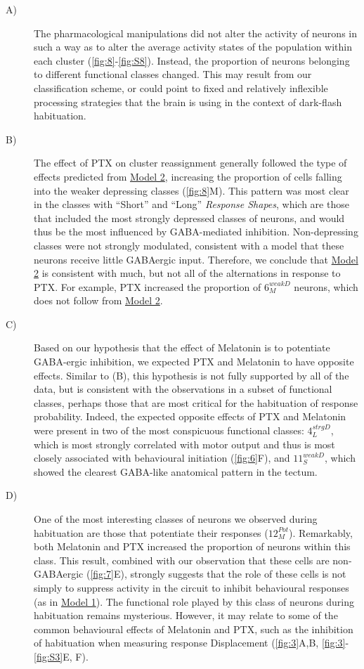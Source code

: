 \documentclass[9pt,lineno]{RandlettLab_elife}
\begin{document}
\begin{description}
\item[A)]
The pharmacological manipulations did not alter the activity of neurons in such a way as to alter the average activity states of the population within each cluster (\autoref{fig:8}-\autoref{fig:S8}). Instead, the proportion of neurons belonging to different functional classes changed. This may result from our classification scheme, or could point to fixed and relatively inflexible processing strategies that the brain is using in the context of dark-flash habituation.
\item[B)]
The effect of PTX on cluster reassignment generally followed the type of effects predicted from \underline{Model 2}, increasing the proportion of cells falling into the weaker depressing classes (\autoref{fig:8}M). This pattern was most clear in the classes with “Short” and “Long” \emph{Response Shapes}, which are those that included the most strongly depressed classes of neurons, and would thus be the most influenced by GABA-mediated inhibition. Non-depressing classes were not strongly modulated, consistent with a model that these neurons receive little GABAergic input. Therefore, we conclude that \underline{Model 2} is consistent with much, but not all of the alternations in response to PTX. For example, PTX increased the proportion of $6_{M}^{weakD}$ neurons, which does not follow from \underline{Model 2}.
\item[C)] 
Based on our hypothesis that the effect of Melatonin is to potentiate GABA-ergic inhibition, we expected PTX and Melatonin to have opposite effects. Similar to (B), this hypothesis is not fully supported by all of the data, but is consistent with the observations in a subset of functional classes, perhaps those that are most critical for the habituation of response probability. Indeed, the expected opposite effects of PTX and Melatonin were present in two of the most conspicuous functional classes: $4_{L}^{strgD}$, which is most strongly correlated with motor output and thus is most closely associated with behavioural initiation (\autoref{fig:6}F), and $11_{S}^{weakD}$, which showed the clearest GABA-like anatomical pattern in the tectum. 
\item[D)]
One of the most interesting classes of neurons we observed during habituation are those that potentiate their responses ($12_{M}^{Pot}$). Remarkably, both Melatonin and PTX increased the proportion of neurons within this class. This result, combined with our observation that these cells are non-GABAergic (\autoref{fig:7}E), strongly suggests that the role of these cells is not simply to suppress activity in the circuit to inhibit behavioural responses (as in \underline{Model 1}). The functional role played by this class of neurons during habituation remains mysterious. However, it may relate to some of the common behavioural effects of Melatonin and PTX, such as the inhibition of habituation when measuring response Displacement (\autoref{fig:3}A,B, \autoref{fig:3}-\autoref{fig:S3}E, F). 

\end{description}
\end{document}
